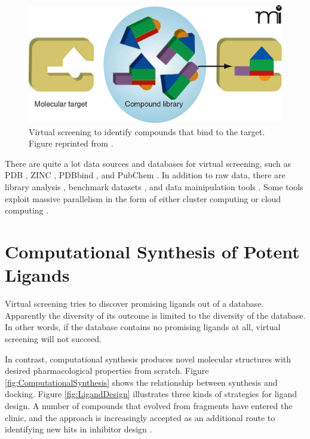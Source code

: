 \begin{figure}
\centering
\includegraphics[width=\textwidth]{Background/VirtualScreening.png}
\caption{Virtual screening to identify compounds that bind to the target. Figure reprinted from \citep{470}.}
\label{fig:VirtualScreening}
\end{figure}

There are quite a lot data sources and databases for virtual screening, such as PDB \citep{540,539,537,105,538}, ZINC \citep{532}, PDBbind \citep{529,530}, and PubChem \citep{526}. In addition to raw data, there are library analysis \citep{521}, benchmark datasets \citep{534,533,535,536}, and data mainipulation tools \citep{542}. Some tools exploit massive parallelism in the form of either cluster computing or cloud computing \citep{557,773,560,782}.

\section{Computational Synthesis of Potent Ligands}

Virtual screening tries to discover promising ligands out of a database. Apparently the diversity of its outcome is limited to the diversity of the database. In other words, if the database contains no promising ligands at all, virtual screening will not succeed.

In contrast, computational synthesis produces novel molecular structures with desired pharmacological properties from scratch. Figure \ref{fig:ComputationalSynthesis} shows the relationship between synthesis and docking. Figure \ref{fig:LigandDesign} \citep{363} illustrates three kinds of strategies for ligand design. A number of compounds that evolved from fragments have entered the clinic, and the approach is increasingly accepted as an additional route to identifying new hits in inhibitor design \citep{363,470}.

